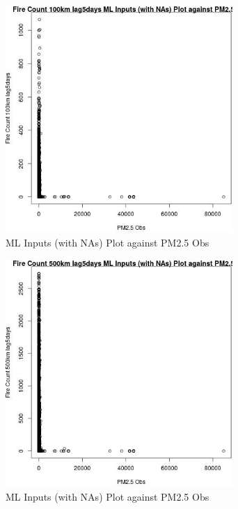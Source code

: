 \begin{figure} 
\centering  
\includegraphics[width=0.77\textwidth]{Code_Outputs/Report_ML_input_PM25_Step4_part_f_de_duplicated_aveswNAs_Fire_Count_100km_lag5daysvPM25_Obs.jpg} 
\caption{\label{fig:Report_ML_input_PM25_Step4_part_f_de_duplicated_aveswNAsFire_Count_100km_lag5daysvPM25_Obs}ML Inputs (with NAs) Plot against PM2.5 Obs} 
\end{figure} 
 

\begin{figure} 
\centering  
\includegraphics[width=0.77\textwidth]{Code_Outputs/Report_ML_input_PM25_Step4_part_f_de_duplicated_aveswNAs_Fire_Count_500km_lag5daysvPM25_Obs.jpg} 
\caption{\label{fig:Report_ML_input_PM25_Step4_part_f_de_duplicated_aveswNAsFire_Count_500km_lag5daysvPM25_Obs}ML Inputs (with NAs) Plot against PM2.5 Obs} 
\end{figure} 
 

